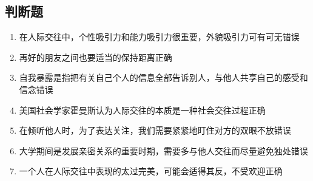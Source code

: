 \documentclass{article}
\begin{document}
	\subsection*{判断题}
	\begin{enumerate}
		\item 在人际交往中，个性吸引力和能力吸引力很重要，外貌吸引力可有可无\hfill 错误
		
		\item 再好的朋友之间也要适当的保持距离\hfill 正确
		
		\item 自我暴露是指把有关自己个人的信息全部告诉别人，与他人共享自己的感受和信念\hfill 错误

		\item 美国社会学家霍曼斯认为人际交往的本质是一种社会交往过程\hfill 正确

		\item 在倾听他人时，为了表达关注，我们需要紧紧地盯住对方的双眼不放\hfill 错误

		\item 大学期间是发展亲密关系的重要时期，需要多与他人交往而尽量避免独处\hfill 错误

		\item 一个人在人际交往中表现的太过完美，可能会适得其反，不受欢迎\hfill 正确


	\end{enumerate}
\end{document}

